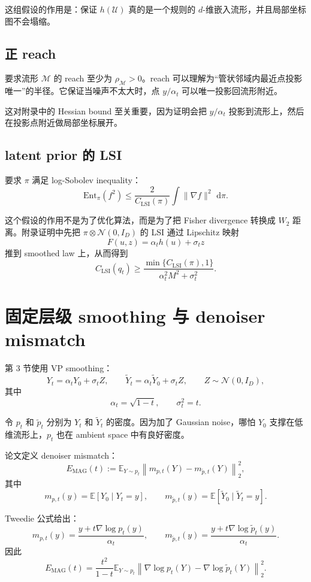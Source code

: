 \documentclass[UTF8,11pt]{ctexart}
\newcommand{\E}{\mathbb{E}}
\newcommand{\cU}{\mathcal{U}}
\newcommand{\cM}{\mathcal{M}}
\newcommand{\cN}{\mathcal{N}}
\newcommand{\dd}{\,\mathrm{d}}
\newcommand{\Ent}{\mathrm{Ent}}
\begin{document}
这组假设的作用是：保证 \(h(\cU)\) 真的是一个规则的 \(d\)-维嵌入流形，并且局部坐标图不会塌缩。

\subsection{正 reach}

要求流形 \(\cM\) 的 reach 至少为 \(\rho_\cM>0\)。reach 可以理解为“管状邻域内最近点投影唯一”的半径。它保证当噪声不太大时，点 \(y/\alpha_t\) 可以唯一投影回流形附近。

这对附录中的 Hessian bound 至关重要，因为证明会把 \(y/\alpha_t\) 投影到流形上，然后在投影点附近做局部坐标展开。

\subsection{latent prior 的 LSI}

要求 \(\pi\) 满足 log-Sobolev inequality：
\[
\Ent_\pi(f^2)
\le
\frac{2}{C_{\mathrm{LSI}}(\pi)}
\int \|\nabla f\|^2\,\dd\pi.
\]

这个假设的作用不是为了优化算法，而是为了把 Fisher divergence 转换成 \(W_2\) 距离。附录证明中先把 \(\pi\otimes \cN(0,I_D)\) 的 LSI 通过 Lipschitz 映射
\[
F(u,z)=\alpha_t h(u)+\sigma_t z
\]
推到 smoothed law 上，从而得到
\[
C_{\mathrm{LSI}}(q_t)
\ge
\frac{\min\{C_{\mathrm{LSI}}(\pi),1\}}
{\alpha_t^2M^2+\sigma_t^2}.
\]

\section{固定层级 smoothing 与 denoiser mismatch}

第 3 节使用 VP smoothing：
\[
Y_t=\alpha_tY_0+\sigma_tZ,
\qquad
\widetilde Y_t=\alpha_t\widetilde Y_0+\sigma_tZ,
\qquad
Z\sim\cN(0,I_D),
\]
其中
\[
\alpha_t=\sqrt{1-t},
\qquad
\sigma_t^2=t.
\]

令 \(p_t\) 和 \(\widetilde p_t\) 分别为 \(Y_t\) 和 \(\widetilde Y_t\) 的密度。因为加了 Gaussian noise，哪怕 \(Y_0\) 支撑在低维流形上，\(p_t\) 也在 ambient space 中有良好密度。

论文定义 denoiser mismatch：
\[
E_{\mathrm{MAG}}(t)
:=
\E_{Y\sim p_t}
\left\|
m_{p,t}(Y)-m_{\widetilde p,t}(Y)
\right\|_2^2,
\]
其中
\[
m_{p,t}(y)=\E[Y_0\mid Y_t=y],
\qquad
m_{\widetilde p,t}(y)=\E[\widetilde Y_0\mid \widetilde Y_t=y].
\]

Tweedie 公式给出：
\[
m_{p,t}(y)
=
\frac{y+t\nabla\log p_t(y)}{\alpha_t},
\qquad
m_{\widetilde p,t}(y)
=
\frac{y+t\nabla\log \widetilde p_t(y)}{\alpha_t}.
\]
因此
\[
E_{\mathrm{MAG}}(t)
=
\frac{t^2}{1-t}
\E_{Y\sim p_t}
\left\|
\nabla\log p_t(Y)-\nabla\log\widetilde p_t(Y)
\right\|_2^2.
\]
\end{document}

